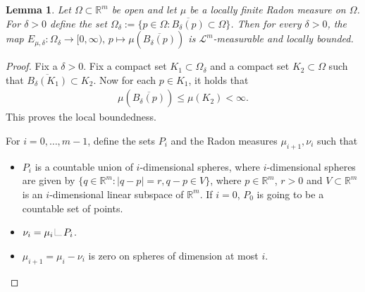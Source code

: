 \documentclass[a4paper,10pt]{article}
\newtheorem{lemma}[theorem]{Lemma}
\numberwithin{equation}{section}
\newcommand{\R}{\mathbb{R}}
\newcommand{\LM}[1]{\hbox{\vrule width.2pt \vbox to#1pt{\vfill \hrule
width#1pt height.2pt}}}
\newcommand{\LL}{{\mathchoice
{\,\LM7\,}{\,\LM7\,}{\,\LM5\,}{\,\LM{3.35}\,}}}
\begin{document}
\begin{lemma}\label{ball_evaluation_measurable}
    Let $\Omega\subset \R^m$ be open and let $\mu$ be a locally finite Radon measure on $\Omega$. 
    For $\delta>0$ define the set $\Omega_\delta:= \{p \in \Omega: \overline{B_\delta(p)}\subset \Omega\}$. 
    Then for every $\delta>0$, the map $E_{\mu, \delta}\colon \Omega_\delta \to [0, \infty),\,   p\mapsto \mu(\overline{B_\delta(p)})$ is $\mathcal{L}^m$-measurable and locally bounded.
\end{lemma}
\begin{proof}
    Fix a $\delta>0$. 
    Fix a compact set $K_1 \subset \Omega_\delta$ and a compact set $K_2 \subset \Omega$ such that $\overline{B_\delta(K_1)} \subset K_2$. Now for each $p \in K_1$, it holds that 
    \begin{align*}
        \mu(\overline{B_\delta(p)}) \leq \mu(K_2) < \infty.
    \end{align*}
    This proves the local boundedness. 

    For $i=0, \ldots, m-1$, define the sets $P_{i}$ and the Radon measures $\mu_{i+1}, \nu_{i}$ such that 
    \begin{itemize}
        \item $P_{i}$ is a countable union of $i$-dimensional spheres, where $i$-dimensional spheres are given by $\{q \in \R^m: |q-p|=r, q-p \in V\}$, where $p \in \R^m$, $r>0$ and $V \subset \R^m$ is an $i$-dimensional linear subspace of $\R^m$. If $i=0$, $P_0$ is going to be a countable set of points.
        \item $\nu_{i}= \mu_{i}\LL P_{i}$.
        \item $\mu_{i+1} = \mu_{i}-\nu_{i}$ is zero on spheres of dimension at most $i$.
    \end{itemize}


\end{proof}
\end{document}
